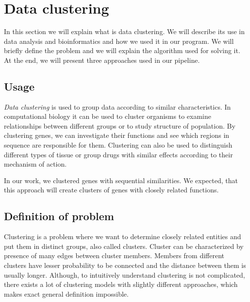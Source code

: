 \section{Data clustering}
In this section we will explain what is data clustering.
We will describe its use in data analysis and bioinformatics and how we used it in our program.
We will briefly define the problem and we will explain the algorithm used for solving it.
At the end, we will present three approaches used in our pipeline.

\subsection{Usage}
\emph{Data clustering} is used to group data according to similar characteristics.
In computational biology it can be used to cluster organisms to examine relationships between different groups or to study structure of population.
By clustering genes, we can investigate their functions and see which regions in sequence are responsible for them.
Clustering can also be used to distinguish different types of tissue or group drugs with similar effects according to their mechanism of action.

In our work, we clustered genes with sequential similarities.
We expected, that this approach will create clusters of genes with closely related functions.

\subsection{Definition of problem}
Clustering is a problem where we want to determine closely related entities and put them in distinct groups, also called clusters.
Cluster can be characterized by presence of many edges between cluster members.
Members from different clusters have lesser probability to be connected and the distance between them is usually longer.
Although, to intuitively understand clustering is not complicated, there exists a lot of clustering models with slightly different approaches, which makes exact general definition impossible.  


